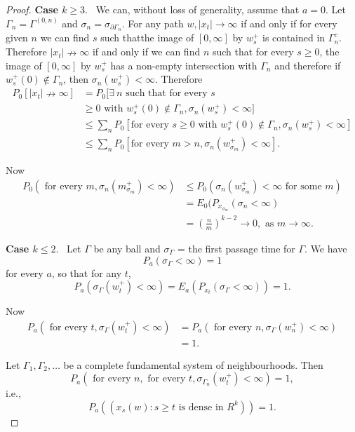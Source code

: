 \begin{proof}
 {\bf Case {\boldmath$k \geq 3$}}.~ We can, without loss of
 generality, assume   that $a=0$. Let $\Gamma_n = \Gamma^{(0, n)}$ and
 $\sigma_n = \sigma_{\partial \Gamma_n}$. For any path $w, |x_t|\to \infty$ if
  and only if for every given $n$ we can find $s$ such
  that\pageoriginale the image
  of $[0, \infty]$ by $w^+_s$ is contained in $\Gamma^c_n$. Therefore
  $|x_t | \nrightarrow \infty$ if and only if we can find $n$ such
  that for every $s \geq 0$, the image of $[0, \infty]$ by $w^+_s$ has
  a non-empty intersection with $\Gamma_n$ and therefore if $w^+_s (0)
  \notin \Gamma_n$, then $\sigma_n (w^+_s) < \infty$. Therefore 
  \begin{align*}
    P_0   \left[ |x_t| \nrightarrow \infty \right ] & = P_0 [
      \exists ~ n \text{ such that for every } s\\ 
      & \geq 0 \text{ with
      }w^+_s(0) \notin \Gamma_n, \sigma_n (w^+_s) < \infty ] \\ 
    & \leq  \sum_n P_0 \left [\text{for every } s \geq 0 \text{ with
      }w^+_s(0) \notin \Gamma_n, \sigma_n (w^+_s) < \infty \right] \\ 
    & \leq \sum_n P_0 \left[\text{for every } m > n,
      \sigma_n(w^+_{\sigma_m}) < \infty \right]. 
  \end{align*}

  Now
  \begin{align*}
    P_0 (\text{ for every } m, \sigma_n (m^+_{\sigma_m}) < \infty ) &
    \leq P_0 (\sigma_n (w^+_{\sigma_m}) < \infty  \text{ for some }m)
    \\ 
    & = E_0 (P_{x_{\sigma_m}} (\sigma_n < \infty) \\
    & = \left(\frac{n}{m}\right)^{k-2} \to 0, \text{ as } m \to \infty.
  \end{align*}

\medskip
\noindent
\textbf{Case {\boldmath$k \leq 2$}}.~ Let $\Gamma$ be any ball and
$\sigma_\Gamma$ = the first passage time for $\Gamma$. We have 
$$
P_a(\sigma_\Gamma < \infty) =1
$$
for every $a$, so that for any $t$,
$$
P_a (\sigma_\Gamma (w^+_t) < \infty) = E_a (P_{x_t}(\sigma_\Gamma <
\infty)) = 1. 
$$

Now\pageoriginale 
\begin{align*}
  P_a (\text{ for every } t , \sigma_\Gamma (w^+_t) < \infty) & = P_a
  (\text{ for every } n, \sigma_\Gamma (w^+_n) < \infty) \\ 
  & = 1.
\end{align*}

Let $\Gamma_1, \Gamma_2 , \ldots$ be a complete fundamental system of
neighbour\-hoods. Then 
$$
P_a (\text{ for every }n, \text{ for every }t,
  \sigma_{\Gamma_n}(w^+_t) < \infty) = 1,
$$
i.e.,
$$
P_a ((x_s(w) : s \geq t\text{ \ \ is dense in \ \ } R^k )) =
  1. 
$$
\end{proof}

